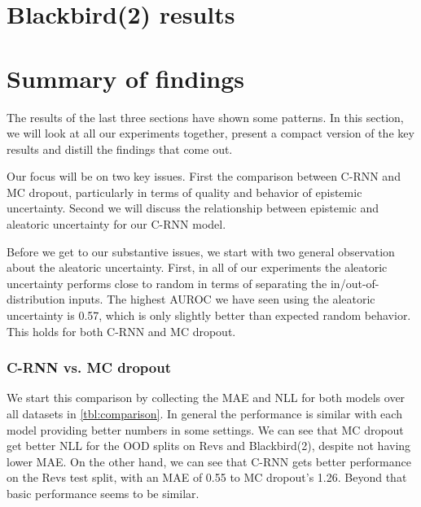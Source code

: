 \documentclass[../main.tex]{subfiles}
\begin{document}
\clearpage
\section{Blackbird(2) results}


\clearpage
\section{Summary of findings}

The results of the last three sections have shown some patterns. In this section, we will look at all our experiments together, present a compact version of the key results and distill the findings that come out.

Our focus will be on two key issues. First the comparison between C-RNN and MC dropout, particularly in terms of quality and behavior of epistemic uncertainty. Second we will discuss the relationship between epistemic and aleatoric uncertainty for our C-RNN model. 

Before we get to our substantive issues, we start with two general observation about the aleatoric uncertainty. First, in all of our experiments the aleatoric uncertainty performs close to random in terms of separating the in/out-of-distribution inputs. The highest AUROC we have seen using the aleatoric uncertainty is 0.57, which is only slightly better than expected random behavior. This holds for both C-RNN and MC dropout. 



\subsubsection{C-RNN vs. MC dropout}

We start this comparison by collecting the MAE and NLL for both models over all datasets in \cref{tbl:comparison}. In general the performance is similar with each model providing better numbers in some settings. We can see that MC dropout get better NLL for the OOD splits on Revs and Blackbird(2), despite not having lower MAE. On the other hand, we can see that C-RNN gets better performance on the Revs test split, with an MAE of 0.55 to MC dropout's 1.26. Beyond that basic performance seems to be similar. 
\end{document}

